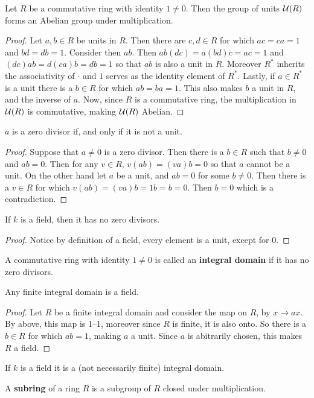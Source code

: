 \begin{lemma}\label{1.1.3}
    Let $R$ be a commutative ring with identity $1 \neq 0$. Then the group of units
    $\mathcal{U}(R)$ forms an Abelian group under multiplication.
\end{lemma}
\begin{proof}
    Let $a,b \in R$ be units in $R$. Then there are $c,d \in R$ for which
    $ac=ca=1$ and  $bd=db=1$. Consider then $ab$. Then  $ab(dc)=a(bd)c=ac=1$ and
    $(dc)ab=d(ca)b=db=1$ so that $ab$ is also a unit in $R$. Moreover $R^\ast$
    inherits the associativity of  $\cdot$ and $1$ serves as the identity
    element of $R^\ast$. Lastly, if $a \in R^\ast$ is a unit there is a $b
    \in R$ for which $ab=ba=1$. This also makes $b$ a unit in $R$, and the
    inverse of $a$. Now, since $R$ is a commutative ring, the multiplication in
     $\mathcal{U}(R)$ is commutative, making $\mathcal{U}(R)$ Abelian.
\end{proof}
\begin{corollary}
    $a$ is a zero divisor if, and only if it is not a unit.
\end{corollary}
\begin{proof}
    Suppose that $a \neq 0$ is a zero divisor. Then there is a  $b \in R$ such
    that $b \neq 0$ and $ab=0$. Then for any $v \in R$,  $v(ab)=(va)b=0$ so that
    $a$ cannot be a unit. On the other hand let  $a$ be a unit, and  $ab=0$ for
    some  $b \neq 0$. Then there is a  $v \in R$ for which
    $v(ab)=(va)b=1b=b=0$. Then $b=0$ which is a contradiction.
\end{proof}
\begin{corollary}
    If $k$ is a field, then it has no zero divisors.
\end{corollary}
\begin{proof}
    Notice by definition of a field, every element is a unit, except for $0$.
\end{proof}

\begin{definition}
    A commutative ring with identity $1 \neq 0$ is called an \textbf{integral
    domain} if it has no zero divisors.
\end{definition}

\begin{lemma}\label{1.1.3}
    Any finite integral domain is a field.
\end{lemma}
\begin{proof}
    Let $R$ be a finite integral domain and consider the map on $R$, by $x
    \xrightarrow{} ax$. By above, this map is 1--1, moreover since $R$ is
    finite, it is also onto. So there is a $b \in R$ for which $ab=1$, making
    $a$ a unit. Since $a$ is abitrarily chosen, this makes $R$ a field.
\end{proof}
\begin{corollary}
    If $k$ is a field it is a (not necessarily finite) integral domain.
\end{corollary}

\begin{definition}
    A \textbf{subring} of a ring $R$ is a subgroup of $R$ closed under
    multiplication.
\end{definition}
